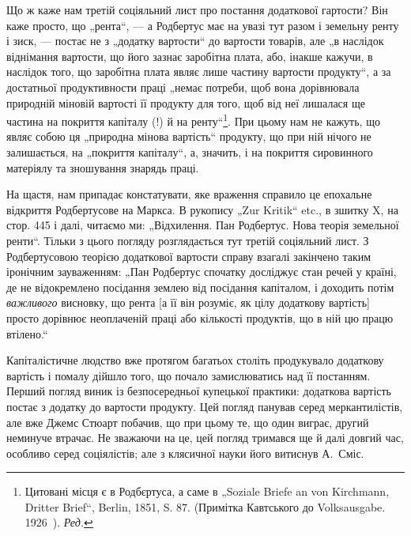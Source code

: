 Що ж каже нам третій соціяльний лист про постання додаткової
гартости? Він каже просто, що „рента“, — а Родбертус має на увазі тут
разом і земельну ренту і зиск, — постає не з „додатку вартости“ до
вартости товарів, але „в наслідок віднімання вартости, що його зазнає заробітна
плата, або, інакше кажучи, в наслідок того, що заробітна плата
являє лише частину вартости продукту“, а за достатньої продуктивности
праці „немає потреби, щоб вона дорівнювала природній міновій вартості
її продукту для того, щоб від неї лишалася ще частина на покриття
капіталу (!) й на ренту“\footnote*{
Цитовані місця є в Родбєртуса, а саме в „Soziale Briefe an von Kirchmann,
Dritter Brief“, Berlin, 1851, S. 87. (Примітка Кавтського до Volksausgabe. 1926~).
\emph{Ред.}
}. При цьому нам не кажуть, що являє собою
ця „природна мінова вартість“ продукту, що при ній нічого не залишається,
на „покриття капіталу“, а, значить, і на покриття сировинного
матеріялу та зношування знарядь праці.

На щастя, нам припадає констатувати, яке враження справило це епохальне
відкриття Родбертусове на Маркса. В рукопису „Zur Kritik“ etc., в зшитку X,
на стор. 445 і далі, читаємо ми: „Відхилення. Пан Родбертус. Нова теорія
земельної ренти“. Тільки з цього погляду розглядається тут третій соціяльний
лист. З Родбертусовою теорією додаткової вартости справу взагалі
закінчено таким іронічним зауваженням: „Пан Родбертус спочатку досліджує
стан речей у країні, де не відокремлено посідання землею від посідання
капіталом, і доходить потім \emph{важливого} висновку, що рента [а її
він розуміє, як цілу додаткову вартість] просто дорівнює неоплаченій
праці або кількості продуктів, що в ній цю працю втілено.“

Капіталістичне людство вже протягом багатьох століть продукувало
додаткову вартість і помалу дійшло того, що почало замислюватись над
її постанням. Перший погляд виник із безпосередньої купецької
практики: додаткова вартість постає з додатку до вартости продукту.
Цей погляд панував серед меркантилістів, але вже Джемс Стюарт побачив,
що при цьому те, що один виграє, другий неминуче втрачає. Не зважаючи
на це, цей погляд тримався ще й далі довгий час, особливо серед
соціялістів; але з клясичної науки його витиснув А.~Сміс.

